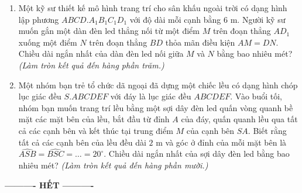 \documentclass[12pt,a4paper]{article}
\begin{document}
\begin{enumerate}
\item \begin{minipage}[t]{0.65\linewidth}
Một kỹ sư thiết kế mô hình trang trí cho sân khấu ngoài trời có dạng hình lập phương $ABCD.A_1B_1C_1D_1$ với độ dài mỗi cạnh bằng $6\text{ m}$. Người kỹ sư muốn gắn một dàn đèn led thẳng nối từ một điểm $M$ trên đoạn thẳng $AD_1$ xuống một điểm $N$ trên đoạn thẳng $BD$ thỏa mãn điều kiện $AM = DN$. Chiều dài ngắn nhất của dàn đèn led nối giữa $M$ và $N$ bằng bao nhiêu mét? \textit{(Làm tròn kết quả đến hàng phần trăm.)}
\end{minipage}\hfill
\begin{minipage}[t]{0.32\linewidth}
\vspace{-0.3\baselineskip}
\centering
{}
\end{minipage}

\item Một nhóm bạn trẻ tổ chức dã ngoại đã dựng một chiếc lều có dạng hình chóp lục giác đều $S.ABCDEF$ với đáy là lục giác đều $ABCDEF$. Vào buổi tối, nhóm bạn muốn trang trí lều bằng một sợi dây đèn led quấn vòng quanh bề mặt các mặt bên của lều, bắt đầu từ đỉnh $A$ của đáy, quấn quanh lều qua tất cả các cạnh bên và kết thúc tại trung điểm $M$ của cạnh bên $SA$. Biết rằng tất cả các cạnh bên của lều đều dài $2\text{ m}$ và góc ở đỉnh của mỗi mặt bên là $\widehat{ASB} = \widehat{BSC} = \dots = 20^\circ$. Chiều dài ngắn nhất của sợi dây đèn led bằng bao nhiêu mét? \textit{(Làm tròn kết quả đến hàng phần mười.)}
\end{enumerate}

\begin{center}
\textbf{---------- HẾT ----------}
\end{center}
\end{document}
